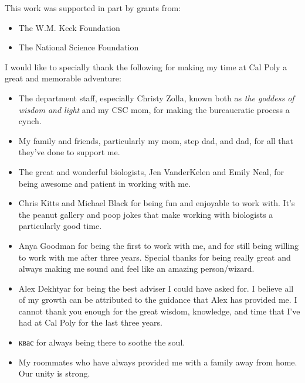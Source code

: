 \documentclass[12pt]{ucthesis}
\begin{document}
\begin{frontmatter}
   \begin{acknowledgements}
      This work was supported in part by grants from:
      \begin{itemize}
         \item The W.M. Keck Foundation
         \item The National Science Foundation
      \end{itemize}
      I would like to specially thank the following for making my time at Cal
      Poly a great and memorable adventure:
      \begin{itemize}
         \item The department staff, especially Christy Zolla, known both as
               \textit{the goddess of wisdom and light} and my CSC mom, for
               making the bureaucratic process a cynch.
         \item My family and friends, particularly my mom, step dad,
               and dad, for all that they've done to support me.
         \item The great and wonderful biologists, Jen VanderKelen and Emily
               Neal, for being awesome and patient in working with me.
         \item Chris Kitts and Michael Black for being fun and enjoyable to
               work with. It's the peanut gallery and poop jokes that make
               working with biologists a particularly good time.
         \item Anya Goodman for being the first to work with me, and for still
               being willing to work with me after three years. Special thanks
               for being really great and always making me sound and feel like
               an amazing person/wizard.
         \item Alex Dekhtyar for being the best adviser I could have asked for.
               I believe all of my growth can be attributed to the guidance
               that Alex has provided me. I cannot thank you enough for the
               great wisdom, knowledge, and time that I've had at Cal Poly for
               the last three years.
         \item \foreignlanguage{russian}{квас} for always being there to soothe
               the soul.
         \item My roommates who have always provided me with a family away from
               home. Our unity is strong.
      \end{itemize}
   \end{acknowledgements}

   \tableofcontents

   \listoftables
   \listoffigures
\end{frontmatter}
\end{document}
